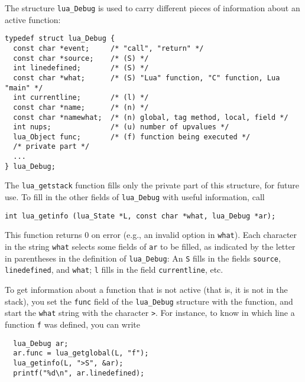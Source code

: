 \documentclass[11pt]{article}
\newcommand{\Deffunc}[1]{\index{#1}}
\begin{document}
\Deffunc{lua_Debug}
The structure \verb|lua_Debug| is used to carry different pieces of information
about an active function:
\begin{verbatim}
typedef struct lua_Debug {
  const char *event;     /* "call", "return" */
  const char *source;    /* (S) */
  int linedefined;       /* (S) */
  const char *what;      /* (S) "Lua" function, "C" function, Lua "main" */
  int currentline;       /* (l) */
  const char *name;      /* (n) */
  const char *namewhat;  /* (n) global, tag method, local, field */
  int nups;              /* (u) number of upvalues */
  lua_Object func;       /* (f) function being executed */
  /* private part */
  ...
} lua_Debug;
\end{verbatim}
The \verb|lua_getstack| function fills only the private part
of this structure, for future use.
To fill in the other fields of \verb|lua_Debug| with useful information,
call \Deffunc{lua_getinfo}
\begin{verbatim}
int lua_getinfo (lua_State *L, const char *what, lua_Debug *ar);
\end{verbatim}
This function returns 0 on error
(e.g., an invalid option in \verb|what|).
Each character in the string \verb|what|
selects some fields of \verb|ar| to be filled,
as indicated by the letter in parentheses in the definition of \verb|lua_Debug|:
An \verb|S| fills in the fields \verb|source|, \verb|linedefined|,
and \verb|what|;
\verb|l| fills in the field \verb|currentline|, etc.

To get information about a function that is not active (that is,
it is not in the stack),
you set the \verb|func| field of the \verb|lua_Debug| structure
with the function,
and start the \verb|what| string with the character \verb|>|.
For instance, to know in which line a function \verb|f| was defined,
you can write
\begin{verbatim}
  lua_Debug ar;
  ar.func = lua_getglobal(L, "f");
  lua_getinfo(L, ">S", &ar);
  printf("%d\n", ar.linedefined);
\end{verbatim}
\end{document}

